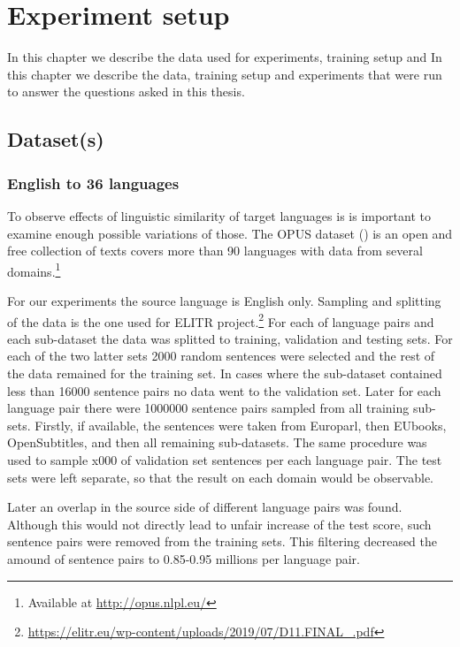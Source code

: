 \chapter{Experiment setup}
\label{chapter:experiment_setup}

In this chapter we describe the data used for experiments, training setup and In this chapter we describe the data, training setup and experiments that were run to answer the questions asked in this thesis.


\section{Dataset(s)}
\label{section:datasets}


\subsection{English to 36 languages}
\label{dataset:en-to-36}

To observe effects of linguistic similarity of target languages is is important to examine enough possible variations of those.
The OPUS dataset (\cite{TIEDEMANN12.463}) is an open and free collection of texts covers more than 90 languages with data from several domains.\footnote{Available at \url{http://opus.nlpl.eu/}} 

For our experiments the source language is English only. Sampling and splitting of the data is the one used for ELITR project.\footnote{\url{https://elitr.eu/wp-content/uploads/2019/07/D11.FINAL_.pdf}}
For each of language pairs  and each sub-dataset the data was splitted to training, validation and testing sets. For each of the two latter sets 2000 random sentences were selected and the rest of the data remained for the training set. In cases where the sub-dataset contained less than 16000 sentence pairs no data went to the validation set.
Later for each language pair there were 1000000 sentence pairs sampled from all training sub-sets. Firstly, if available, the sentences were taken from Europarl, then EUbooks, OpenSubtitles, and then all remaining sub-datasets.  
The same procedure was used to sample x000 of validation set sentences per each language pair. The test sets were left separate, so that the result on each domain would be observable.

Later an overlap in the source side of different language pairs was found. Although this would not directly lead to unfair increase of the test score, such sentence pairs were removed from the training sets. This filtering decreased the amound of sentence pairs to 0.85-0.95 millions per language pair.




